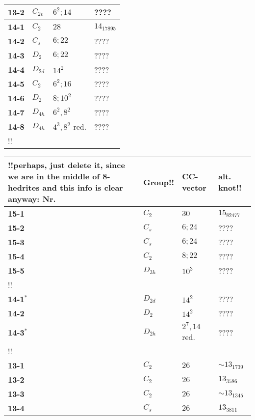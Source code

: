 \documentclass[12pt]{article}
\begin{document}
\begin{table}
\begin{center}
{\begin{minipage}{7cm}
\begin{tabular}{||l|l|l|l||}
{\bf 13-2}      &$C_{2v}$       &$6^2; 14$      &????\\\hline
{\bf 14-1}      &$C_2$  &$28$           &$14_{17895}$\\
{\bf 14-2}      &$C_s$  &$6; 22$                &????\\
{\bf 14-3}      &$D_2$  &$6; 22$                &????\\
{\bf 14-4}      &$D_{2d}$       &$14^2$         &????\\
{\bf 14-5}      &$C_2$  &$6^2; 16$      &????\\
{\bf 14-6}      &$D_2$  &$8; 10^2$      &????\\
{\bf 14-7}      &$D_{4h}$       &$6^2, 8^2$     &????\\
{\bf 14-8}      &$D_{4h}$       &$4^3, 8^2$ red.        &????\\\hline
!!%
\end{tabular}
\end{minipage}
\begin{minipage}[t]{7cm}
\begin{tabular}{||l|l|l|l||}
\hline
!!perhaps, just delete it, since we are in the middle of 8-hedrites and this 
info is clear anyway: Nr.     &Group!!    &CC-vector      &alt. knot!!\\\hline
{\bf 15-1}      &$C_2$  &$30$   &$15_{82477}$\\
{\bf 15-2}      &$C_s$  &$6; 24$        &????\\
{\bf 15-3}      &$C_s$  &$6;24$ &????\\
{\bf 15-4}      &$C_2$  &$8; 22$        &????\\
{\bf 15-5}      &$D_{3h}$       &$10^3$ &????\\\hline \hline!!
\multicolumn{4}{||c||}{$4$-hedrites}\\\hline
{\bf 14-1${}^*$}&$D_{2d}$       &$14^2$         &????\\\hline
{\bf 14-2}      &$D_2$  &$14^2$         &????\\ 
{\bf 14-3${}^*$}&$D_{2h}$       &$2^7, 14$ red.  &????\\
\hline \hline!!
\multicolumn{4}{||c||}{$6$-hedrites}\\\hline
{\bf 13-1}      &$C_2$  &$26$           &$\sim 13_{1739}$\\
{\bf 13-2}      &$C_2$  &$26$           &$13_{3586}$\\
{\bf 13-3}      &$C_2$  &$26$           &$\sim 13_{1345}$\\
{\bf 13-4}      &$C_s$  &$26$           &$13_{3811}$\\

\end{tabular}
\end{minipage}}
\end{center}
\end{table}
\end{document}
